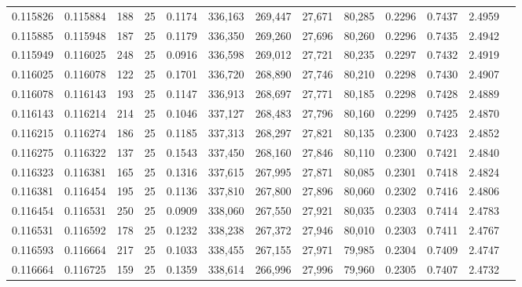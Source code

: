 \begin{tabular}{rrrrrrrrrrrrr}
0.115826 & 0.115884 &   188 &  25 &                                     0.1174 & 336,163 & 269,447 &  27,671 &  80,285 & 0.2296 & 0.7437 & 2.4959 \\
0.115885 & 0.115948 &   187 &  25 &                                     0.1179 & 336,350 & 269,260 &  27,696 &  80,260 & 0.2296 & 0.7435 & 2.4942 \\
0.115949 & 0.116025 &   248 &  25 &                                     0.0916 & 336,598 & 269,012 &  27,721 &  80,235 & 0.2297 & 0.7432 & 2.4919 \\
0.116025 & 0.116078 &   122 &  25 &                                     0.1701 & 336,720 & 268,890 &  27,746 &  80,210 & 0.2298 & 0.7430 & 2.4907 \\
0.116078 & 0.116143 &   193 &  25 &                                     0.1147 & 336,913 & 268,697 &  27,771 &  80,185 & 0.2298 & 0.7428 & 2.4889 \\
0.116143 & 0.116214 &   214 &  25 &                                     0.1046 & 337,127 & 268,483 &  27,796 &  80,160 & 0.2299 & 0.7425 & 2.4870 \\
0.116215 & 0.116274 &   186 &  25 &                                     0.1185 & 337,313 & 268,297 &  27,821 &  80,135 & 0.2300 & 0.7423 & 2.4852 \\
0.116275 & 0.116322 &   137 &  25 &                                     0.1543 & 337,450 & 268,160 &  27,846 &  80,110 & 0.2300 & 0.7421 & 2.4840 \\
0.116323 & 0.116381 &   165 &  25 &                                     0.1316 & 337,615 & 267,995 &  27,871 &  80,085 & 0.2301 & 0.7418 & 2.4824 \\
0.116381 & 0.116454 &   195 &  25 &                                     0.1136 & 337,810 & 267,800 &  27,896 &  80,060 & 0.2302 & 0.7416 & 2.4806 \\
0.116454 & 0.116531 &   250 &  25 &                                     0.0909 & 338,060 & 267,550 &  27,921 &  80,035 & 0.2303 & 0.7414 & 2.4783 \\
0.116531 & 0.116592 &   178 &  25 &                                     0.1232 & 338,238 & 267,372 &  27,946 &  80,010 & 0.2303 & 0.7411 & 2.4767 \\
0.116593 & 0.116664 &   217 &  25 &                                     0.1033 & 338,455 & 267,155 &  27,971 &  79,985 & 0.2304 & 0.7409 & 2.4747 \\
0.116664 & 0.116725 &   159 &  25 &                                     0.1359 & 338,614 & 266,996 &  27,996 &  79,960 & 0.2305 & 0.7407 & 2.4732 \\

\end{tabular}
